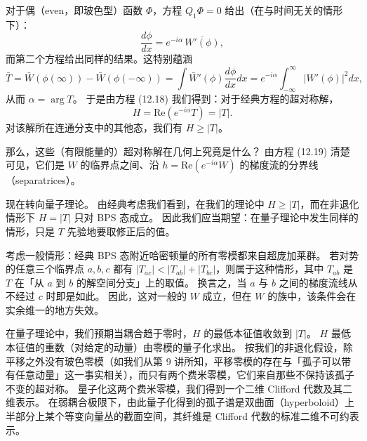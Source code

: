 对于偶（even，即玻色型）函数 $\Phi$，方程 $Q_1\Phi=0$ 给出（在与时间无关的情形下）：
\begin{equation}
  \tag{12.19}
  \label{eq:12-19}
  \frac{d\phi}{dx}=e^{-i\alpha}\,\overline{W'(\phi)},
\end{equation}
而第二个方程给出同样的结果。这特别蕴涵
\begin{equation}
  \tag{12.20}
  \label{eq:12-20}
  \bar T=\bar W(\phi(\infty))-\bar W(\phi(-\infty))
  =\int\bar W'(\phi)\frac{d\phi}{dx}dx
  =e^{-i\alpha}\int_{-\infty}^{\infty}|W'(\phi)|^2dx,
\end{equation}
从而 $\alpha=\arg T$。
于是由方程 (12.18) 我们得到：对于经典方程的超对称解，
\begin{equation}
  \tag{12.21}
  \label{eq:12-21}
  H=\mathrm{Re}(e^{-i\alpha}T)=|T|.
\end{equation}
对该解所在连通分支中的其他态，我们有 $H\ge|T|$。


那么，这些（有限能量的）超对称解在几何上究竟是什么？
由方程 (12.19) 清楚可见，它们是 $W$ 的临界点之间、沿 $h=\mathrm{Re}(e^{-i\alpha}W)$ 的梯度流的分界线（separatrices）。

现在转向量子理论。
由经典考虑我们看到，在我们的理论中 $H\ge|T|$，而在非退化情形下 $H=|T|$ 只对 BPS 态成立。
因此我们应当期望：在量子理论中发生同样的情形，只是 $T$ 先验地要取修正后的值。

考虑一般情形：经典 BPS 态附近哈密顿量的所有零模都来自超庞加莱群。
若对势的任意三个临界点 $a,b,c$ 都有 $|T_{ac}|<|T_{ab}|+|T_{bc}|$，则属于这种情形，其中 $T_{ab}$ 是 $T$ 在「从 $a$ 到 $b$ 的解空间分支」上的取值。
换言之，当 $a$ 与 $b$ 之间的梯度流线从不经过 $c$ 时即是如此。
因此，这对一般的 $W$ 成立，但在 $W$ 的族中，该条件会在实余维一的地方失效。

在量子理论中，我们预期当耦合趋于零时，$H$ 的最低本征值收敛到 $|T|$。
$H$ 最低本征值的重数（对给定的动量）由零模的量子化求出。
按我们的非退化假设，除平移之外没有玻色零模（如我们从第 9 讲所知，平移零模的存在与「孤子可以带有任意动量」这一事实相关），而只有两个费米零模，它们来自那些不保持该孤子不变的超对称。
量子化这两个费米零模，我们得到一个二维 Clifford 代数及其二维表示。
在弱耦合极限下，由此量子化得到的孤子谱是双曲面（hyperboloid）上半部分上某个等变向量丛的截面空间，其纤维是 Clifford 代数的标准二维不可约表示。

